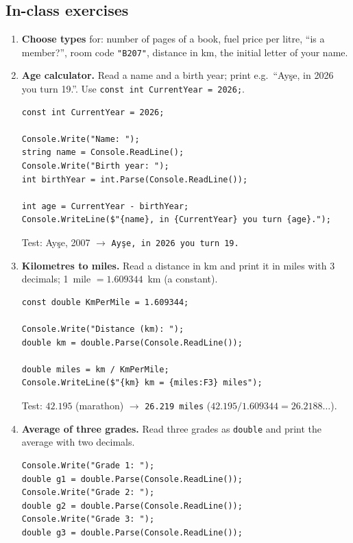 \subsection{In-class exercises}
\begin{enumerate}[label=\textbf{E\arabic*.},leftmargin=*,itemsep=1pt]
  \item {} \textbf{Choose types} for: number of pages of a book, fuel price per litre, ``is a member?'', room code \texttt{"B207"}, distance in km, the initial letter of your name.
  \item {} \textbf{Age calculator.} Read a name and a birth year; print e.g.\ ``Ayşe, in 2026 you turn 19.''. Use \texttt{const int CurrentYear = 2026;}.
  \ifsolutions\begin{solbox}\begin{lstlisting}[numbers=none]
const int CurrentYear = 2026;

Console.Write("Name: ");
string name = Console.ReadLine();
Console.Write("Birth year: ");
int birthYear = int.Parse(Console.ReadLine());

int age = CurrentYear - birthYear;
Console.WriteLine($"{name}, in {CurrentYear} you turn {age}.");
\end{lstlisting}
 Test: Ayşe, 2007 $\to$ \texttt{Ayşe, in 2026 you turn 19.}
\end{solbox}\fi
  \item {} \textbf{Kilometres to miles.} Read a distance in km and print it in miles with 3 decimals; 1~mile $=1.609344$~km (a constant).
  \ifsolutions\begin{solbox}\begin{lstlisting}[numbers=none]
const double KmPerMile = 1.609344;

Console.Write("Distance (km): ");
double km = double.Parse(Console.ReadLine());

double miles = km / KmPerMile;
Console.WriteLine($"{km} km = {miles:F3} miles");
\end{lstlisting}
 Test: $42.195$ (marathon) $\to$ \texttt{26.219 miles} ($42.195/1.609344 = 26.2188\ldots$).
\end{solbox}\fi
  \item {} \textbf{Average of three grades.} Read three grades as \texttt{double} and print the average with two decimals.
  \ifsolutions\begin{solbox}\begin{lstlisting}[numbers=none]
Console.Write("Grade 1: ");
double g1 = double.Parse(Console.ReadLine());
Console.Write("Grade 2: ");
double g2 = double.Parse(Console.ReadLine());
Console.Write("Grade 3: ");
double g3 = double.Parse(Console.ReadLine());


\end{lstlisting}
\end{solbox}
\end{enumerate}
